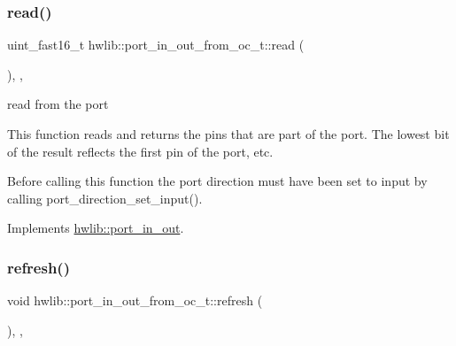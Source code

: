 \mbox{\label{classhwlib_1_1port__in__out__from__oc__t_a9d57f7d3ee2ef22d16d6c47ec914c0fd}} 
\subsubsection{\texorpdfstring{read()}{read()}}
{\footnotesize\ttfamily uint\+\_\+fast16\+\_\+t hwlib\+::port\+\_\+in\+\_\+out\+\_\+from\+\_\+oc\+\_\+t\+::read (\begin{DoxyParamCaption}{ }\end{DoxyParamCaption})\hspace{0.3cm}{\ttfamily [inline]}, {\ttfamily [override]}, {\ttfamily [virtual]}}

read from the port

This function reads and returns the pins that are part of the port. The lowest bit of the result reflects the first pin of the port, etc.

Before calling this function the port direction must have been set to input by calling port\+\_\+direction\+\_\+set\+\_\+input(). 

Implements \hyperlink{classhwlib_1_1port__in__out_a5f6662d6fccd2b256d20722a4f3e5840}{hwlib\+::port\+\_\+in\+\_\+out}.

\mbox{\label{classhwlib_1_1port__in__out__from__oc__t_a18b040a25923ba0189c5689e2dedb233}} 
\subsubsection{\texorpdfstring{refresh()}{refresh()}}
{\footnotesize\ttfamily void hwlib\+::port\+\_\+in\+\_\+out\+\_\+from\+\_\+oc\+\_\+t\+::refresh (\begin{DoxyParamCaption}{ }\end{DoxyParamCaption})\hspace{0.3cm}{\ttfamily [inline]}, {\ttfamily [override]}, {\ttfamily [virtual]}}

